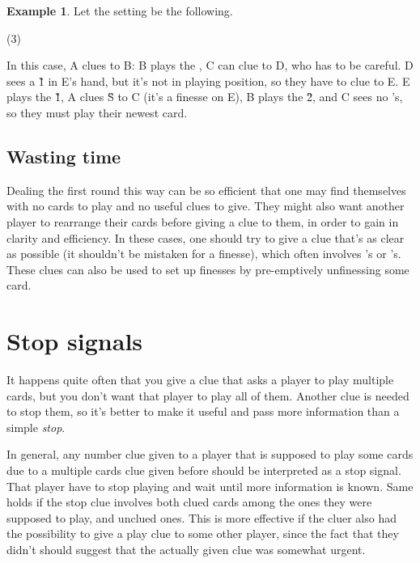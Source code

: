 \documentclass[a4paper]{article}
\theoremstyle{plain}
\theoremstyle{definition}
\newtheorem{example}[theorem]{Example}
\begin{document}
\begin{example}
	
	Let the setting be the following.
	
	\begin{tasks}(3)
		\task[+]      
		\task[A]    
		\task[B]    
		\task[C]    
		\task[D]    
		\task[E]    
	\end{tasks}
	
	In this case, A clues  to B: B plays the , C can clue  to D, who has to be careful. D sees a \G{1} in E's hand, but it's not in playing position, so they have to clue  to E. E plays the \G{1}, A clues \G{S} to C (it's a finesse on E), B plays the \G{2}, and C sees no 's, so they must play their newest card.
\end{example}

\subsection{Wasting time}

Dealing the first round this way can be so efficient that one may find themselves with no cards to play and no useful clues to give. They might also want another player to rearrange their cards before giving a clue to them, in order to gain in clarity and efficiency. In these cases, one should try to give a clue that's as clear as possible (it shouldn't be mistaken for a finesse), which often involves 's or 's. These clues can also be used to set up finesses by pre-emptively unfinessing some card. 
                                                           
\section{Stop signals}
\label{stopsignals}

It happens quite often that you give a clue that asks a player to play multiple cards, but you don't want that player to play all of them. Another clue is needed to stop them, so it's better to make it useful and pass more information than a simple \textit{stop}.

In general, any number clue given to a player that is supposed to play some cards due to a multiple cards clue given before should be interpreted as a stop signal. That player have to stop playing and wait until more information is known. Same holds if the stop clue involves both clued cards among the ones they were supposed to play, and unclued ones. This is more effective if the cluer also had the possibility to give a play clue to some other player, since the fact that they didn't should suggest that the actually given clue was somewhat urgent.
\end{document}
